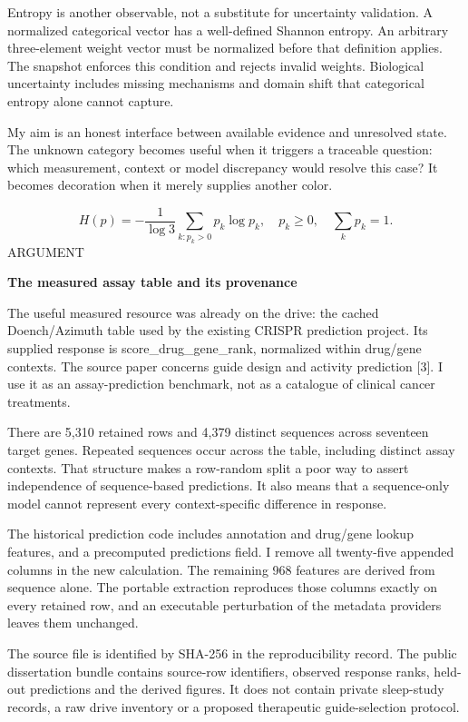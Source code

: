 \documentclass[10pt]{article}
\begin{document}
Entropy is another observable, not a substitute for uncertainty validation. A normalized categorical vector has a well-defined Shannon entropy. An arbitrary three-element weight vector must be normalized before that definition applies. The snapshot enforces this condition and rejects invalid weights. Biological uncertainty includes missing mechanisms and domain shift that categorical entropy alone cannot capture.\par
My aim is an honest interface between available evidence and unresolved state. The unknown category becomes useful when it triggers a traceable question: which measurement, context or model discrepancy would resolve this case? It becomes decoration when it merely supplies another color.\par
\[H(p)=-\frac{1}{\log 3}\sum_{k:p_k>0}p_k\log p_k,\quad p_k\geq0,\quad\sum_kp_k=1.\]
\clearpage
\hypertarget{p11}{}
{\small\color{accent}\MakeUppercase{Argument}}\par
{\LARGE\bfseries\color{ink}The measured assay table and its provenance}\par\vspace{5pt}
The useful measured resource was already on the drive: the cached Doench/Azimuth table used by the existing CRISPR prediction project. Its supplied response is score\_drug\_gene\_rank, normalized within drug/gene contexts. The source paper concerns guide design and activity prediction [3]. I use it as an assay-prediction benchmark, not as a catalogue of clinical cancer treatments.\par
There are 5,310 retained rows and 4,379 distinct sequences across seventeen target genes. Repeated sequences occur across the table, including distinct assay contexts. That structure makes a row-random split a poor way to assert independence of sequence-based predictions. It also means that a sequence-only model cannot represent every context-specific difference in response.\par
The historical prediction code includes annotation and drug/gene lookup features, and a precomputed predictions field. I remove all twenty-five appended columns in the new calculation. The remaining 968 features are derived from sequence alone. The portable extraction reproduces those columns exactly on every retained row, and an executable perturbation of the metadata providers leaves them unchanged.\par
The source file is identified by SHA-256 in the reproducibility record. The public dissertation bundle contains source-row identifiers, observed response ranks, held-out predictions and the derived figures. It does not contain private sleep-study records, a raw drive inventory or a proposed therapeutic guide-selection protocol.\par
\end{document}
